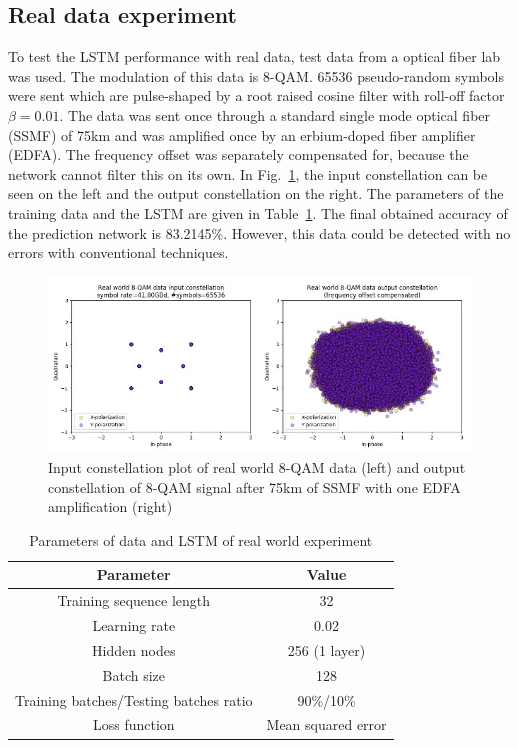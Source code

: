 \documentclass[journal,10pt,twoside, a4paper]{IEEEtran}
\begin{document}
\subsection{Real data experiment}
To test the LSTM performance with real data, test data from a optical fiber lab was used. The modulation of this data is 8-QAM. 65536 pseudo-random symbols were sent which are pulse-shaped by a root raised cosine filter with roll-off factor $\beta=0.01$. The data was sent once through a standard single mode optical fiber (SSMF) of 75km and was amplified once by an erbium-doped fiber amplifier (EDFA). The frequency offset was separately compensated for, because the network cannot filter this on its own. In Fig.~\ref{fig:input}, the input constellation can be seen on the left and the output constellation on the right. The parameters of the training data and the LSTM are given in Table~\ref{tab:real_parameters}. The final obtained accuracy of the prediction network is 83.2145\%. However, this data could be detected with no errors with conventional techniques.

\begin{figure}
    \centering
    \includegraphics[width=\linewidth]{Thesis/images/real.jpg}
    \caption{Input constellation plot of real world 8-QAM data (left) and output constellation of 8-QAM signal after 75km of SSMF with one EDFA amplification (right)}
    \label{fig:input}
\end{figure}

\begin{table}
    \centering
    \caption{Parameters of data and LSTM of real world experiment}
    \label{tab:real_parameters}
    \begin{tabular}{c|c}
        Parameter & Value\\
        \hline
        Training sequence length & 32\\
        Learning rate & 0.02\\
        Hidden nodes & 256 (1 layer)\\
        Batch size & 128\\
        Training batches/Testing batches ratio & 90\%/10\%\\
        Loss function & Mean squared error\\
    \end{tabular}
\end{table}
\end{document}
